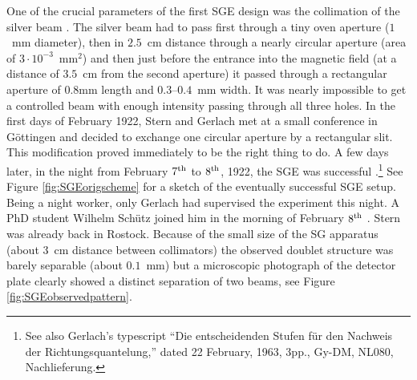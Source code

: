 \documentclass{article}
\begin{document}
One of the crucial parameters of the first SGE design was the collimation of the silver beam \citep{GerlachWEtal1922Nachweis}. The silver beam had to pass first through a tiny oven aperture ($1$~mm diameter), then in $2.5$~cm distance through a nearly circular aperture (area of $3\cdot10^{-3}$~mm$^2$) and then just before the entrance into the magnetic field (at a distance of $3.5$~cm from the second aperture) it passed through a rectangular aperture of $0.8$mm length and $0.3$--$0.4$~mm width. It was nearly impossible to get a controlled beam with enough intensity passing through all three holes. In the first days of February 1922, Stern and Gerlach met at a small conference in Göttingen \citep{FriedrichBEtal2003Stern} and decided to exchange one circular aperture by a rectangular slit. This modification proved immediately to be the right thing to do. A few days later, in the night from February $7^{\rm th}$ to $8^{\rm th}$, 1922, the SGE was successful \citep{GerlachWEtal1922Nachweis}.\footnote{See also Gerlach's typescript ``Die entscheidenden Stufen f\"ur den Nachweis der Richtungsquantelung,'' dated 22 February, 1963, 3pp., Gy-DM, NL080, Nachlieferung.}  See Figure \ref{fig:SGEorigscheme} for a sketch of the eventually successful SGE setup. Being a night worker, only Gerlach had supervised the experiment this night. A PhD student Wilhelm Schütz joined him in the morning of February $8^{\rm th}$ \citep{SchuetzW1969Erinnerungen}. Stern was already back in Rostock. Because of the small size of the SG apparatus (about $3$~cm distance between collimators) the observed doublet structure was barely separable (about $0.1$~mm) but a microscopic photograph of the detector plate clearly showed a distinct separation of two beams, see Figure \ref{fig:SGEobservedpattern}.
\end{document}
